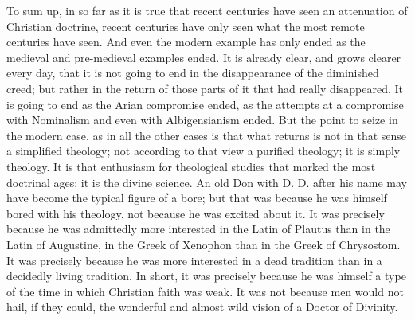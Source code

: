 To sum up, in so far as it is true that recent centuries have seen an attenuation of Christian doctrine, recent centuries have only seen what the most remote centuries have seen. And even the modern example has only ended as the medieval and pre-medieval examples ended. It is already clear, and grows clearer every day, that it is not going to end in the disappearance of the diminished creed; but rather in the return of those parts of it that had really disappeared. It is going to end as the Arian compromise ended, as the attempts at a compromise with Nominalism and even with Albigensianism ended. But the point to seize in the modern case, as in all the other cases is that what returns is not in that sense a simplified theology; not according to that view a purified theology; it is simply theology. It is that enthusiasm for theological studies that marked the most doctrinal ages; it is the divine science. An old Don with D. D. after his name may have become the typical figure of a bore; but that was because he was himself bored with his theology, not because he was excited about it. It was precisely because he was admittedly more interested in the Latin of Plautus than in the Latin of Augustine, in the Greek of Xenophon than in the Greek of Chrysostom. It was precisely because he was more interested in a dead tradition than in a decidedly living tradition. In short, it was precisely because he was himself a type of the time in which Christian faith was weak. It was not because men would not hail, if they could, the wonderful and almost wild vision of a Doctor of Divinity.

